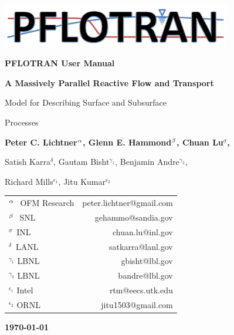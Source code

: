 \begin{center}

\includegraphics[width=0.75\textwidth]{./figs/pflotran_logo.jpg}

\dblline

{\bf\huge PFLOTRAN User Manual}

\vspace{0.5cm}

{\bf\LARGE A Massively Parallel Reactive Flow and Transport 

Model for Describing Surface and Subsurface 

Processes}

\vspace{0.5cm}

{\bf\large Peter C. Lichtner${^{\alpha}}$, Glenn E. Hammond${^{\beta}}$, Chuan Lu${^\sigma}$, 

Satish Karra${^\delta}$, Gautam Bisht$^{\gamma_1}$, Benjamin Andre$^{\gamma_2}$, 

Richard Mills$^{\epsilon_1}$, Jitu Kumar$^{\epsilon_2}$}

\vspace{0.5cm}

\begin{tabular}{lr}
$^{{\alpha}_{~}}$ OFM Research & peter.lichtner@gmail.com\\
$^{{\beta}_{~}}$ SNL & gehammo@sandia.gov\\
$^{\sigma_{~}}$ INL & chuan.lu@inl.gov\\
$^{\delta_{~}}$ LANL & satkarra@lanl.gov\\
$^{\gamma_1^{}}$ LBNL & gbisht@lbl.gov\\
$^{\gamma_2^{}}$ LBNL & bandre@lbl.gov\\
$^{\epsilon_1^{}}$ Intel & rtm@eecs.utk.edu \\
$^{\epsilon_2^{}}$ ORNL & jitu1503@gmail.com
\end{tabular}

\vspace{0.5cm}

{\bf\large\today}

\vspace{0.5cm}

\end{center}

